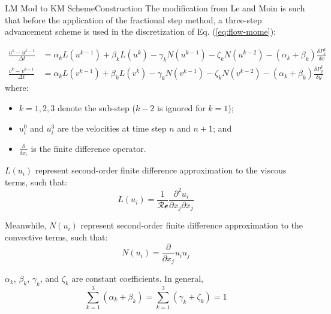 \documentclass[\string~/GitHub/sthlmNordBeamerTheme/sthlmNordLightDemo.tex]{subfiles}
\begin{document}
\begin{frame}{LM Mod to KM Scheme}{Construction}
    The modification from Le and Moin is such that before the application of the fractional step method, a three-step advancement scheme is used in the discretization of Eq. (\ref{eq:flow-mome}):

    \begin{align}
        \frac{u^k - u^{k-1}}{\Delta t} &= \alpha_k L \left( u^{k-1} \right) + \beta_k L \left( u^k \right) - \gamma_k N \left( u^{k-1} \right) - \zeta_k N \left( u^{k-2} \right) - (\alpha_k + \beta_k) \frac{\delta P^k_x}{\delta x} \\
        \frac{v^k - v^{k-1}}{\Delta t} &= \alpha_k L \left( v^{k-1} \right) + \beta_k L \left( v^k \right) - \gamma_k N \left( v^{k-1} \right) - \zeta_k N \left( v^{k-2} \right) - (\alpha_k + \beta_k) \frac{\delta P^k_y}{\delta y}
    \end{align}
    where: \begin{itemize}
        \item $k = 1, 2, 3$ denote the sub-step ($k-2$ is ignored for $k=1$);
        \item $u^0_i$ and $u^3_i$ are the velocities at time step $n$ and $n+1$; and
        \item $\frac{\delta }{\delta x_i}$ is the finite difference operator.
    \end{itemize}

    \framebreak
    
    $L(u_i)$ represent second-order finite difference approximation to the viscous terms, such that: \begin{equation}
        L (u_i) = \frac{1}{\mathcal{Re}} \frac{\partial^2 u_i}{\partial x_j \partial x_j}
        \label{eq:viscous_terms}
    \end{equation}

    Meanwhile, $N(u_i)$ represent second-order finite difference approximation to the convective terms, such that: \begin{equation}
        N (u_i) = \frac{\partial }{\partial x_j} u_i u_j
        \label{eq:convective_terms}
    \end{equation}

    \framebreak

    $\alpha_k$, $\beta_k$, $\gamma_k$, and $\zeta_k$ are constant coefficients. In general, \begin{equation}
        \sum_{k=1}^{3} (\alpha_k + \beta_k) = \sum_{k=1}^{3} (\gamma_k + \zeta_k) = 1
    \end{equation} 


\end{frame}
\end{document}
